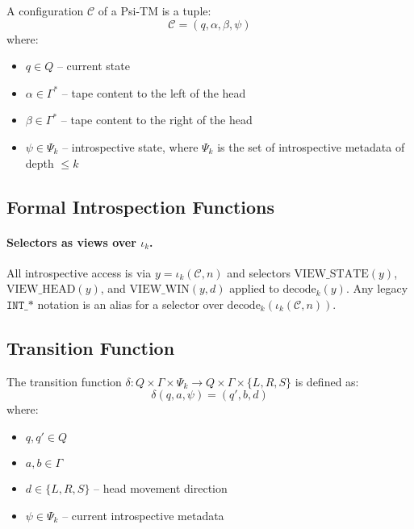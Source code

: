\begin{definition}
A configuration $\mathcal{C}$ of a Psi-TM is a tuple:
$$\mathcal{C} = (q, \alpha, \beta, \psi)$$
where:
\begin{itemize}
\item $q \in Q$ -- current state
\item $\alpha \in \Gamma^*$ -- tape content to the left of the head
\item $\beta \in \Gamma^*$ -- tape content to the right of the head
\item $\psi \in \Psi_k$ -- introspective state, where $\Psi_k$ is the set of introspective metadata of depth $\leq k$
\end{itemize}
\end{definition}

\subsection{Formal Introspection Functions}

\paragraph{Selectors as views over $\iota_k$.}
All introspective access is via $y=\iota_k(\mathcal{C},n)$ and selectors $\mathrm{VIEW\_STATE}(y)$, $\mathrm{VIEW\_HEAD}(y)$, and $\mathrm{VIEW\_WIN}(y,d)$ applied to $\mathrm{decode}_k(y)$. Any legacy $\texttt{INT\_*}$ notation is an alias for a selector over $\mathrm{decode}_k(\iota_k(\mathcal{C},n))$.

\subsection{Transition Function}

\begin{definition}
The transition function $\delta: Q \times \Gamma \times \Psi_k \to Q \times \Gamma \times \{L, R, S\}$ is defined as:
$$\delta(q, a, \psi) = (q', b, d)$$
where:
\begin{itemize}
\item $q, q' \in Q$
\item $a, b \in \Gamma$
\item $d \in \{L, R, S\}$ -- head movement direction
\item $\psi \in \Psi_k$ -- current introspective metadata
\end{itemize}
\end{definition}

